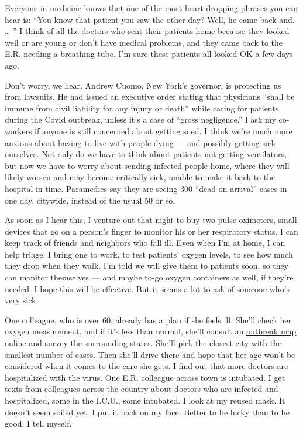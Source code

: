 Everyone in medicine knows that one of the most heart-dropping phrases
you can hear is: ``You know that patient you saw the other day? Well, he
came back and. \ldots{} '' I think of all the doctors who sent their
patients home because they looked well or are young or don't have
medical problems, and they came back to the E.R. needing a breathing
tube. I'm sure these patients all looked OK a few days ago.

Don't worry, we hear, Andrew Cuomo, New York's governor, is protecting
us from lawsuits. He had issued an executive order stating that
physicians ``shall be immune from civil liability for any injury or
death'' while caring for patients during the Covid outbreak, unless it's
a case of ``gross negligence.'' I ask my co-workers if anyone is still
concerned about getting sued. I think we're much more anxious about
having to live with people dying --- and possibly getting sick
ourselves. Not only do we have to think about patients not getting
ventilators, but now we have to worry about sending infected people
home, where they will likely worsen and may become critically sick,
unable to make it back to the hospital in time. Paramedics say they are
seeing 300 ``dead on arrival'' cases in one day, citywide, instead of
the usual 50 or so.

As soon as I hear this, I venture out that night to buy two pulse
oximeters, small devices that go on a person's finger to monitor his or
her respiratory status. I can keep track of friends and neighbors who
fall ill. Even when I'm at home, I can help triage. I bring one to work,
to test patients' oxygen levels, to see how much they drop when they
walk. I'm told we will give them to patients soon, so they can monitor
themselves --- and maybe to-go oxygen containers as well, if they're
needed. I hope this will be effective. But it seems a lot to ask of
someone who's very sick.

One colleague, who is over 60, already has a plan if she feels ill.
She'll check her oxygen measurement, and if it's less than normal,
she'll consult an
\href{https://www.nytimes3xbfgragh.onion/interactive/2020/us/coronavirus-us-cases.html}{outbreak
map online} and survey the surrounding states. She'll pick the closest
city with the smallest number of cases. Then she'll drive there and hope
that her age won't be considered when it comes to the care she gets. I
find out that more doctors are hospitalized with the virus. One E.R.
colleague across town is intubated. I get texts from colleagues across
the country about doctors who are infected and hospitalized, some in the
I.C.U., some intubated. I look at my reused mask. It doesn't seem soiled
yet. I put it back on my face. Better to be lucky than to be good, I
tell myself.

